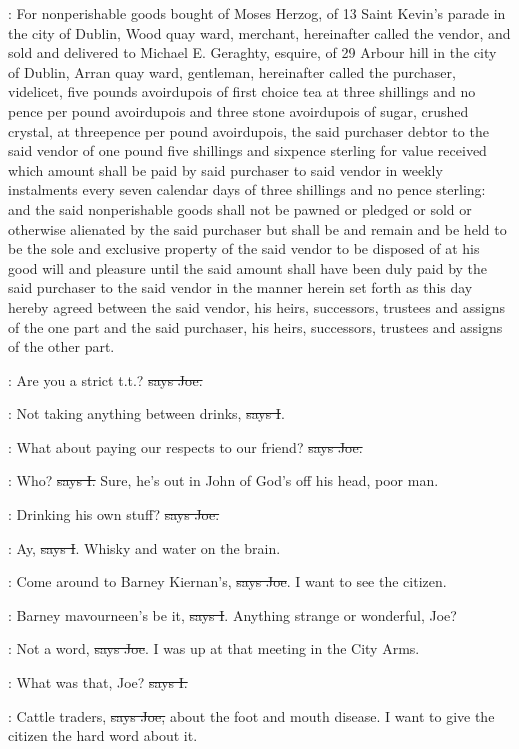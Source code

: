 :
For nonperishable goods bought of Moses Herzog, of 13 Saint
Kevin's parade in the city of Dublin, Wood quay ward, merchant,
hereinafter called the vendor, and sold and delivered to Michael E.
Geraghty, esquire, of 29 Arbour hill in the city of Dublin, Arran quay
ward, gentleman, hereinafter called the purchaser, videlicet, five pounds
avoirdupois of first choice tea at three shillings and no pence per pound
avoirdupois and three stone avoirdupois of sugar, crushed crystal, at
threepence per pound avoirdupois, the said purchaser debtor to the said
vendor of one pound five shillings and sixpence sterling for value
received which amount shall be paid by said purchaser to said vendor in
weekly instalments every seven calendar days of three shillings and no
pence sterling: and the said nonperishable goods shall not be pawned or
pledged or sold or otherwise alienated by the said purchaser but shall be
and remain and be held to be the sole and exclusive property of the said
vendor to be disposed of at his good will and pleasure until the said
amount shall have been duly paid by the said purchaser to the said vendor
in the manner herein set forth as this day hereby agreed between the said
vendor, his heirs, successors, trustees and assigns of the one part and
the said purchaser, his heirs, successors, trustees and assigns of the
other part.

\joe:
Are you a strict t.t.? \sout{says Joe.}

:
Not taking anything between drinks, \sout{says I}.

\joe:
What about paying our respects to our friend? \sout{says Joe.}

:
Who? \sout{says I.}
Sure, he's out in John of God's off his head, poor man.

\joe:
Drinking his own stuff? \sout{says Joe.}

:
Ay, \sout{says I}. Whisky and water on the brain.

\joe:
Come around to Barney Kiernan's, \sout{says Joe}.
I want to see the citizen.

:
Barney mavourneen's be it, \sout{says I}.
Anything strange or wonderful, Joe?

\joe:
Not a word, \sout{says Joe}.
I was up at that meeting in the City Arms.

:
What was that, Joe? \sout{says I.}

\joe:
Cattle traders, \sout{says Joe,}
about the foot and mouth disease. I want to
give the citizen the hard word about it.

